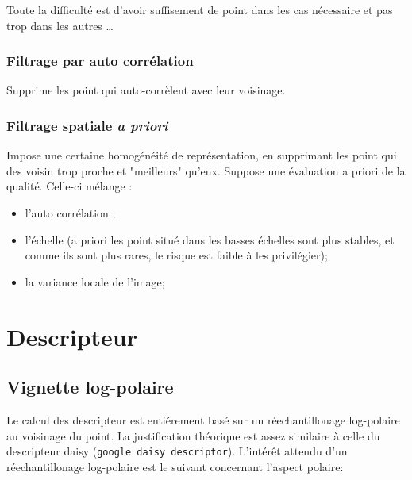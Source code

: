 Toute la difficult\'e est d'avoir suffisement de point dans les cas n\'ecessaire et pas trop
dans les autres \dots


\subsubsection{Filtrage par auto corr\'elation}

Supprime les point qui auto-corr\`elent avec leur voisinage.

\subsubsection{Filtrage spatiale \emph{a priori}}

Impose une certaine homog\'en\'eit\'e de repr\'esentation, en supprimant les point 
qui des voisin trop proche et "meilleurs" qu'eux. Suppose une \'evaluation a priori
de la qualit\'e. Celle-ci m\'elange : 

\begin{itemize}
   \item l'auto corr\'elation ;
   \item l'\'echelle (a priori les point situ\'e dans les basses \'echelles sont plus stables,
         et comme ils sont plus rares, le risque est faible \`a les privil\'egier);
   \item  la variance locale de l'image;
\end{itemize}
 


\section{Descripteur}


\subsection{Vignette log-polaire}



Le calcul des descripteur est enti\'erement bas\'e sur un r\'eechantillonage log-polaire 
au voisinage du point.  La justification th\'eorique est assez similaire \`a celle du descripteur
daisy ({\tt google daisy descriptor}).  L'int\'er\^et attendu d'un  r\'eechantillonage log-polaire
est le suivant concernant l'aspect polaire:

